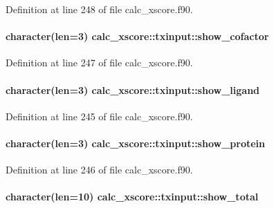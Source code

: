 Definition at line 248 of file calc\-\_\-xscore.\-f90.

\hypertarget{structcalc__xscore_1_1txinput_a3e40c25a2524d886ee23f1e6de6ff011}{
\paragraph[{show\-\_\-cofactor}]{\setlength{\rightskip}{0pt plus 5cm}character(len=3) calc\-\_\-xscore\-::txinput\-::show\-\_\-cofactor}}\label{structcalc__xscore_1_1txinput_a3e40c25a2524d886ee23f1e6de6ff011}


Definition at line 247 of file calc\-\_\-xscore.\-f90.

\hypertarget{structcalc__xscore_1_1txinput_a8d13a4c4d79c1a5606669157b5a61e62}{
\paragraph[{show\-\_\-ligand}]{\setlength{\rightskip}{0pt plus 5cm}character(len=3) calc\-\_\-xscore\-::txinput\-::show\-\_\-ligand}}\label{structcalc__xscore_1_1txinput_a8d13a4c4d79c1a5606669157b5a61e62}


Definition at line 245 of file calc\-\_\-xscore.\-f90.

\hypertarget{structcalc__xscore_1_1txinput_aabc83b6bd164f155ea2e78bcd1ff81ae}{
\paragraph[{show\-\_\-protein}]{\setlength{\rightskip}{0pt plus 5cm}character(len=3) calc\-\_\-xscore\-::txinput\-::show\-\_\-protein}}\label{structcalc__xscore_1_1txinput_aabc83b6bd164f155ea2e78bcd1ff81ae}


Definition at line 246 of file calc\-\_\-xscore.\-f90.

\hypertarget{structcalc__xscore_1_1txinput_a3dc54e8b7db596a2907d35304dc01c49}{
\paragraph[{show\-\_\-total}]{\setlength{\rightskip}{0pt plus 5cm}character(len=10) calc\-\_\-xscore\-::txinput\-::show\-\_\-total}}\label{structcalc__xscore_1_1txinput_a3dc54e8b7db596a2907d35304dc01c49}


